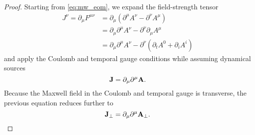 \begin{proof}
	Starting from \cref{eq:mw_eom}, we expand the field-strength tensor
	\begin{equation*}
		\begin{split}
			J^\nu
			=
			\partial_\mu
			F^{\mu\nu}
			&=
			\partial_\mu
			\left(
				\partial^\mu
				A^\nu
				-
				\partial^\nu
				A^\mu
			\right)
			\\
			&=
			\partial_\mu
			\partial^\mu
			A^\nu
			-
			\partial^\nu
			\partial_\mu
			A^\mu
			\\
			&=
			\partial_\mu
			\partial^\mu
			A^\nu
			-
			\partial^\nu
			\left(
				\partial_t A^0
				+
				\partial_i A^i
			\right)
		\end{split}
	\end{equation*}
	and apply the Coulomb and temporal gauge conditions while assuming dynamical sources
	\begin{equation*}
		\vb{J}
		=
		\partial_\mu
		\partial^\mu
		\vb{A}
		.
	\end{equation*}
	Because the Maxwell field in the Coulomb and temporal gauge is transverse, the previous equation reduces further to
	\begin{equation*}
		\vb{J}_\perp
		=
		\partial_\mu
		\partial^\mu
		\vb{A}_\perp
		.		
	\end{equation*}
\end{proof}

